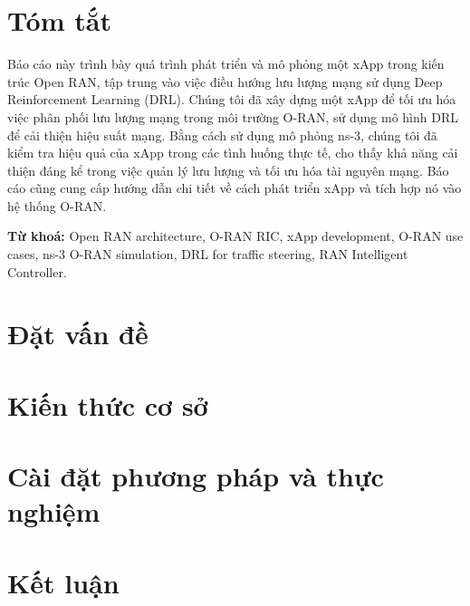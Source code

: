 \documentclass[12pt]{report}
\begin{document}
\chapter*{Tóm tắt}
Báo cáo này trình bày quá trình phát triển và mô phỏng một xApp trong kiến trúc Open RAN, tập trung vào việc điều hướng lưu lượng mạng sử dụng Deep Reinforcement Learning (DRL). Chúng tôi đã xây dựng một xApp để tối ưu hóa việc phân phối lưu lượng mạng trong môi trường O-RAN, sử dụng mô hình DRL để cải thiện hiệu suất mạng. Bằng cách sử dụng mô phỏng ns-3, chúng tôi đã kiểm tra hiệu quả của xApp trong các tình huống thực tế, cho thấy khả năng cải thiện đáng kể trong việc quản lý lưu lượng và tối ưu hóa tài nguyên mạng. Báo cáo cũng cung cấp hướng dẫn chi tiết về cách phát triển xApp và tích hợp nó vào hệ thống O-RAN.

\textbf{Từ khoá:} Open RAN architecture, O-RAN RIC, xApp development, O-RAN use cases, ns-3 O-RAN simulation, DRL for traffic steering, RAN Intelligent Controller.

\tableofcontents





\chapter{Đặt vấn đề}


\chapter{Kiến thức cơ sở}




% 

\chapter{Cài đặt phương pháp và thực nghiệm}






\chapter{Kết luận}


% 

\printbibliography[heading=bibintoc]
\end{document}
